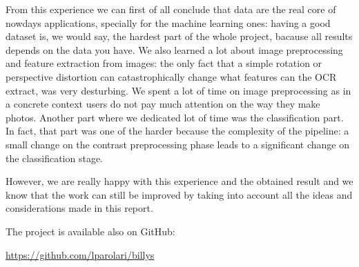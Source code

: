 \documentclass[10pt,twocolumn,letterpaper]{article}
\begin{document}
From this experience we can first of all conclude that data are the
real core of nowdays applications, specially for the machine learning
ones: having a good dataset is, we would say, the hardest part of the
whole project, bacause all results depends on the data you have. We
also learned a lot about image preprocessing and feature extraction
from images: the only fact that a simple rotation or perspective
distortion can catastrophically change what features can the OCR
extract, was very desturbing. We spent a lot of time on image
preprocessing as in a concrete context users do not pay much attention
on the way they make photos. Another part where we dedicated lot of
time was the classification part. In fact, that part was one of the
harder because the complexity of the pipeline: a small change on the
contrast preprocessing phase leads to a significant change on the
classification stage.

However, we are really happy with this experience and the obtained
result and we know that the work can still be improved by taking into
account all the ideas and considerations made in this report.

The project is available also on GitHub:
\begin{center}
  \href{https://github.com/lparolari/billys}{https://github.com/lparolari/billys}
\end{center}

{\small


}
\end{document}

